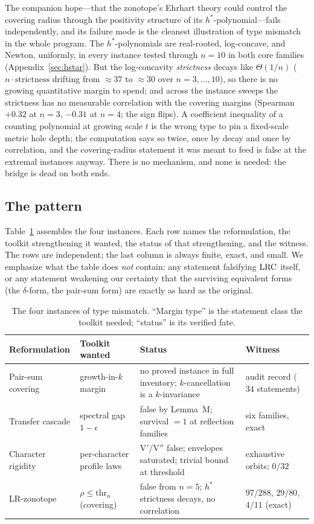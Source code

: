 The companion hope---that the zonotope's Ehrhart theory could control
the covering radius through the positivity structure of its
$h^*$-polynomial---fails independently, and its failure mode is the
cleanest illustration of type mismatch in the whole program. The
$h^*$-polynomials are real-rooted, log-concave, and Newton, uniformly,
in every instance tested through $n=10$ in both core families
(Appendix~\ref{sec:hstar}). But the log-concavity \emph{strictness}
decays like $\Theta(1/n)$ ($n\cdot\text{strictness}$ drifting from
$\approx37$ to $\approx30$ over $n=3,\dots,10$), so there is no growing
quantitative margin to spend; and across the instance sweeps the
strictness has no measurable correlation with the covering margins
(Spearman $+0.32$ at $n=3$, $-0.31$ at $n=4$; the sign flips). A
coefficient inequality of a counting polynomial at growing scale $t$ is
the wrong type to pin a fixed-scale metric hole depth; the computation
says so twice, once by decay and once by correlation, and the
covering-radius statement it was meant to feed is false at the extremal
instances anyway. There is no mechanism, and none is needed: the bridge
is dead on both ends.

\subsection{The pattern}

Table~\ref{tab:instances} assembles the four instances. Each row names
the reformulation, the toolkit strengthening it wanted, the status of
that strengthening, and the witness. The rows are independent; the last
column is always finite, exact, and small. We emphasize what the table
does \emph{not} contain: any statement falsifying $\mathrm{LRC}$ itself, or any
statement weakening our certainty that the surviving equivalent forms
(the $\delta$-form, the pair-sum form) are exactly as hard as the
original.

\begin{table}[htbp]
\centering
\small
\caption{The four instances of type mismatch. ``Margin type'' is the
statement class the toolkit needed; ``status'' is its verified fate.}
\label{tab:instances}
\begin{tabularx}{\textwidth}{@{} l >{\raggedright\arraybackslash}X
>{\raggedright\arraybackslash}X l @{}}
\toprule
Reformulation & Toolkit wanted & Status & Witness \\
\midrule
Pair-sum covering & growth-in-$k$ margin & no proved instance in full
inventory; $k$-cancellation is a $k$-invariance & audit record
($34$ statements) \\
Transfer cascade & spectral gap $1-\epsilon$ & false by Lemma~M;
survival $=1$ at reflection families & six families, exact \\
Character rigidity & per-character profile laws & V$'$/V$''$ false;
envelopes saturated; trivial bound at threshold & exhaustive orbits;
$0/32$ \\
LR-zonotope & $\rho\le\mathrm{thr}_n$ (covering) & false from $n=5$;
$h^*$ strictness decays, no correlation & $97/288$, $29/80$, $4/11$
(exact) \\
\bottomrule
\end{tabularx}
\end{table}
